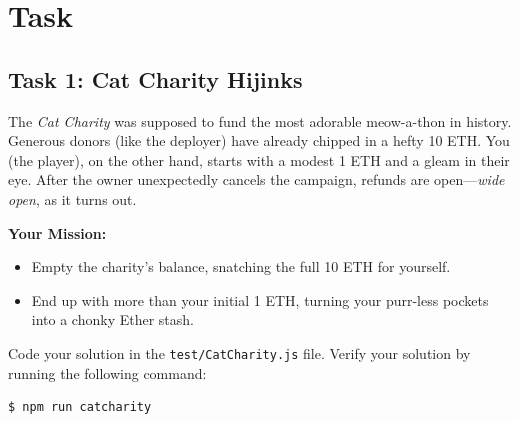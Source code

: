 \documentclass[12pt]{article}
\begin{document}
\section{Task}

\subsection{Task 1: Cat Charity Hijinks}

The \emph{Cat Charity} was supposed to fund the most adorable meow-a-thon in history. Generous donors (like the deployer) have already chipped in a hefty 10 ETH. You (the player), on the other hand, starts with a modest 1 ETH and a gleam in their eye. After the owner unexpectedly cancels the campaign, refunds are open—\emph{wide open}, as it turns out. 

\medskip
\noindent
\textbf{Your Mission:}
\begin{itemize}
    \item Empty the charity's balance, snatching the full 10 ETH for yourself.
    \item End up with more than your initial 1 ETH, turning your purr-less pockets into a chonky Ether stash.
\end{itemize}

\noindent
Code your solution in the \texttt{test/CatCharity.js} file. Verify your solution by running the following command:

\begin{verbatim}
$ npm run catcharity
\end{verbatim}
\end{document}
